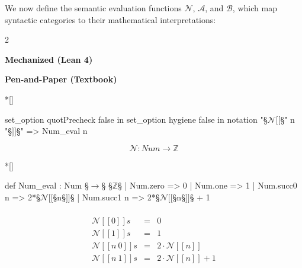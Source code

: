 We now define the semantic evaluation functions $\mathcal{N}$, $\mathcal{A}$, and $\mathcal{B}$,
which map syntactic categories to their mathematical interpretations:
\begin{paracol}{2}
\begin{leftcolumn}
    \centering \textbf{Mechanized (Lean 4)}
\end{leftcolumn}
\begin{rightcolumn}
    \centering \textbf{Pen-and-Paper (Textbook)} \\\noindent
\end{rightcolumn}

\switchcolumn[1]*[]
\begin{leftcolumn}
    \begin{Lean_Code}
set_option quotPrecheck
  false in
set_option hygiene false in
notation "§\color{purple}\(\mathcal{N}[\![\)§" n "§\color{purple}\(]\!]\)§" =>
  Num_eval  n
    \end{Lean_Code}
\end{leftcolumn}
\begin{rightcolumn}
    \[
    \mathcal{N} : Num \to \mathbb{Z}
    \]
\end{rightcolumn}

\switchcolumn[1]*[]
\begin{leftcolumn}
    \begin{Lean_Code}
def Num_eval : Num §\(\to\)§ §\(\mathbb{Z}\)§
  | Num.zero    => 0
  | Num.one     => 1
  | Num.succ0 n => 2*§\(\mathcal{N}[\![\)§n§\(]\!]\)§
  | Num.succ1 n => 2*§\(\mathcal{N}[\![\)§n§\(]\!]\)§ + 1
    \end{Lean_Code}
\end{leftcolumn}
\begin{rightcolumn}
    \[
    \begin{array}{rcl}
        \\[0.3em]
        \mathcal{N}[\![0]\!]s &=& 0 \\
        \mathcal{N}[\![1]\!]s &=& 1 \\
        \mathcal{N}[\![n\ 0]\!]s &=& 2 \cdot \mathcal{N}[\![n]\!] \\
        \mathcal{N}[\![n\ 1]\!]s &=& 2 \cdot \mathcal{N}[\![n]\!] + 1
    \end{array}
    \]
\end{rightcolumn}
\end{paracol}
\vspace{1em}

